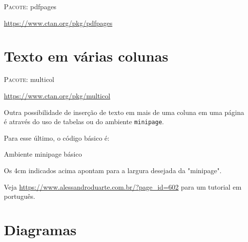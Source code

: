 \documentclass[a4paper,12pt,oneside,openright,extrafontsizes,openbib]{memoir}
\begin{document}
{\textsc{Pacote:} pdfpages

\url{https://www.ctan.org/pkg/pdfpages}

\section{Texto em várias colunas}\label{sec:multicol}

\textsc{Pacote:} multicol

\url{https://www.ctan.org/pkg/multicol}

Outra possibilidade de inserção de texto em mais de uma coluna em uma página é através do uso de tabelas ou do ambiente \verb|minipage|. 

Para esse último, o código básico é:

\begin{codex}{Ambiente minipage básico}
    \begin{minipage}{4cm}
       Os {4cm} indicados acima apontam para a largura desejada da "minipage". 
    \end{minipage}
\end{codex}

Veja \url{https://www.alessandroduarte.com.br/?page_id=602} para um tutorial em português.

\section{Diagramas}\label{sec:smartdiagram{}

\textsc{Pacote:} smartdiagram

\url{https://www.ctan.org/pkg/smartdiagram}

\section{Aspas e outros símbolos tipográficos}\label{sec:textcmds}

\textsc{Pacote:} textcmds

\url{https://ctan.math.illinois.edu/macros/latex/contrib/amsrefs/textcmds.pdf}

Esse pacote foi incluído porque em modo \textit{offline} o \LaTeX habitualmente não reconhece os espaços necessários entre as aspas. O Overleaf já o faz nativamente (embora eu tenha observado erros nas aspas simples...).

\section{Hiperlinks com quebra de endereço por linha}\label{sec:xurl}

}}
\end{document}
